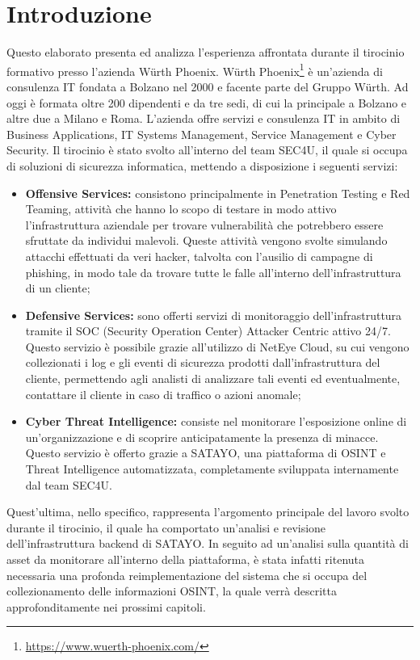 \chapter{Introduzione}
\label{cha:introduction}

Questo elaborato presenta ed analizza l'esperienza affrontata durante il
tirocinio formativo presso l'azienda Würth Phoenix. Würth Phoenix\footnote{\url{https://www.wuerth-phoenix.com/}}
è un'azienda di consulenza IT fondata a Bolzano nel 2000 e facente parte del
Gruppo Würth. Ad oggi è formata oltre 200 dipendenti e da tre sedi, di cui la
principale a Bolzano e altre due a Milano e Roma. L'azienda offre servizi e consulenza
IT in ambito di Business Applications, IT Systems Management, Service Management
e Cyber Security. Il tirocinio è stato svolto all'interno del team SEC4U, il quale
si occupa di soluzioni di sicurezza informatica, mettendo a disposizione i
seguenti servizi:

\begin{itemize}
  \item \textbf{Offensive Services:} consistono principalmente in Penetration
    Testing e Red Teaming, attività che hanno lo scopo di testare in modo attivo
    l'infrastruttura aziendale per trovare vulnerabilità che potrebbero essere sfruttate
    da individui malevoli. Queste attività vengono svolte simulando attacchi
    effettuati da veri hacker, talvolta con l'ausilio di campagne di phishing,
    in modo tale da trovare tutte le falle all'interno dell'infrastruttura di un
    cliente;

  \item \textbf{Defensive Services:} sono offerti servizi di monitoraggio dell'infrastruttura
    tramite il SOC (Security Operation Center) Attacker Centric attivo 24/7.
    Questo servizio è possibile grazie all'utilizzo di NetEye Cloud, su cui vengono
    collezionati i log e gli eventi di sicurezza prodotti dall'infrastruttura del
    cliente, permettendo agli analisti di analizzare tali eventi ed
    eventualmente, contattare il cliente in caso di traffico o azioni anomale;

  \item \textbf{Cyber Threat Intelligence:} consiste nel monitorare l'esposizione
    online di un'organizzazione e di scoprire anticipatamente la presenza di
    minacce. Questo servizio è offerto grazie a SATAYO, una piattaforma di OSINT
    e Threat Intelligence automatizzata, completamente sviluppata internamente dal
    team SEC4U.
\end{itemize}

Quest'ultima, nello specifico, rappresenta l'argomento principale del lavoro svolto
durante il tirocinio, il quale ha comportato un'analisi e revisione dell'infrastruttura
backend di SATAYO. In seguito ad un'analisi sulla quantità di asset da monitorare
all'interno della piattaforma, è stata infatti ritenuta necessaria una profonda
reimplementazione del sistema che si occupa del collezionamento delle
informazioni OSINT, la quale verrà descritta approfonditamente nei prossimi capitoli.